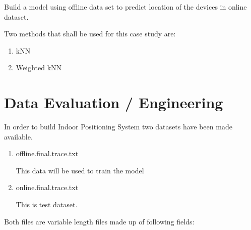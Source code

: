 \documentclass[
]{article}
\providecommand{\tightlist}{%
  \setlength{\itemsep}{0pt}\setlength{\parskip}{0pt}}
\begin{document}
Build a model using offline data set to predict location of the devices
in online dataset.

Two methods that shall be used for this case study are:

\begin{enumerate}
\def\labelenumi{\arabic{enumi}.}
\tightlist
\item
  kNN
\item
  Weighted kNN
\end{enumerate}

\newpage

\hypertarget{data-evaluation-engineering}{%
\section{Data Evaluation /
Engineering}\label{data-evaluation-engineering}}

In order to build Indoor Positioning System two datasets have been made
available.

\begin{enumerate}
\def\labelenumi{\arabic{enumi}.}
\item
  offline.final.trace.txt

  This data will be used to train the model
\item
  online.final.trace.txt

  This is test dataset.
\end{enumerate}

Both files are variable length files made up of following fields:
\end{document}
